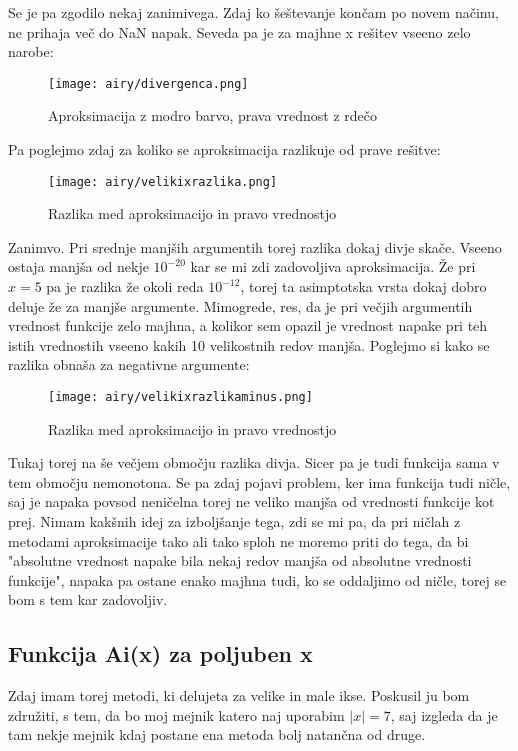 \documentclass{article}
\begin{document}
Se je pa zgodilo nekaj zanimivega. Zdaj ko šeštevanje končam po novem načinu, ne prihaja več do NaN napak. Seveda pa je za majhne x rešitev vseeno zelo narobe:

\begin{figure}[H]
\texttt{[image: airy/divergenca.png]}
\caption*{Aproksimacija z modro barvo, prava vrednost z rdečo}
\end{figure}


Pa poglejmo zdaj za koliko se aproksimacija razlikuje od prave rešitve:

\begin{figure}[H]
\texttt{[image: airy/velikixrazlika.png]}
\caption*{Razlika med aproksimacijo in pravo vrednostjo}
\end{figure}

Zanimvo. Pri srednje manjših argumentih torej razlika dokaj divje skače. Vseeno ostaja manjša od nekje $10^{-20}$ kar se mi zdi zadovoljiva aproksimacija. Že pri $x=5$ pa je razlika že okoli reda $10^{-12}$, torej ta asimptotska vrsta dokaj dobro deluje že za manjše argumente.
Mimogrede, res, da je pri večjih argumentih vrednost funkcije zelo majhna, a kolikor sem opazil je vrednost napake pri teh istih vrednostih vseeno kakih 10 velikostnih redov manjša.
Poglejmo si kako se razlika obnaša za negativne argumente:

\begin{figure}[H]
\texttt{[image: airy/velikixrazlikaminus.png]}
\caption*{Razlika med aproksimacijo in pravo vrednostjo}
\end{figure}

Tukaj torej na še večjem območju razlika divja. Sicer pa je tudi funkcija sama v tem območju nemonotona. Se pa zdaj pojavi problem, ker ima funkcija tudi ničle, saj je napaka povsod neničelna torej ne veliko manjša od vrednosti funkcije kot prej. Nimam kakšnih idej za izboljšanje tega, zdi se mi pa, da pri ničlah z metodami aproksimacije tako ali tako sploh ne moremo priti do tega, da bi "absolutne vrednost napake bila nekaj redov manjša od absolutne vrednosti funkcije", napaka pa ostane enako majhna tudi, ko se oddaljimo od ničle, torej se bom s tem kar zadovoljiv.

\subsection{Funkcija Ai(x) za poljuben x}

Zdaj imam torej metodi, ki delujeta za velike in male ikse. Poskusil ju bom združiti, s tem, da bo moj mejnik katero naj uporabim $|x|=7$, saj izgleda  da je tam nekje mejnik kdaj postane ena metoda bolj natančna od druge.
\end{document}
